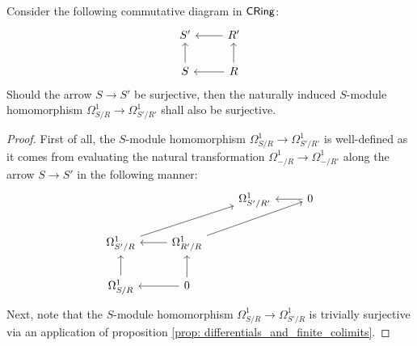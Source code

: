                 \begin{lemma} \label{lemma: surjections_between_modules_of_differentials}
                    Consider the following commutative diagram in $\mathsf{CRing}$:
                        $$
                            \begin{tikzcd}
                            	{S'} & {R'} \\
                            	S & R
                            	\arrow[from=2-1, to=1-1]
                            	\arrow[from=2-2, to=1-2]
                            	\arrow[from=1-2, to=1-1]
                            	\arrow[from=2-2, to=2-1]
                            \end{tikzcd}
                        $$
                    Should the arrow $S \to S'$ be surjective, then the naturally induced $S$-module homomorphism $\Omega^1_{S/R} \to \Omega^1_{S'/R'}$ shall also be surjective.
                \end{lemma}
                    \begin{proof}
                        First of all, the $S$-module homomorphism $\Omega^1_{S/R} \to \Omega^1_{S'/R'}$ is well-defined as it comes from evaluating the natural transformation $\Omega^1_{-/R} \to \Omega^1_{-/R'}$ along the arrow $S \to S'$ in the following manner:
                            $$
                                \begin{tikzcd}
                                	& {} & {\Omega^1_{S'/R'}} & 0 \\
                                	{\Omega^1_{S'/R}} & {\Omega^1_{R'/R}} \\
                                	{\Omega^1_{S/R}} & 0
                                	\arrow[from=3-2, to=2-2]
                                	\arrow[from=3-2, to=3-1]
                                	\arrow[from=3-1, to=2-1]
                                	\arrow[from=2-2, to=2-1]
                                	\arrow[from=1-4, to=1-3]
                                	\arrow[from=2-1, to=1-3]
                                	\arrow[from=2-2, to=1-4]
                                \end{tikzcd}
                            $$
                        Next, note that the $S$-module homomorphism $\Omega^1_{S/R} \to \Omega^1_{S'/R}$ is trivially surjective via an application of proposition \ref{prop: differentials_and_finite_colimits}.
                    \end{proof}
                    
